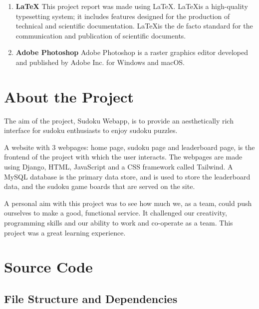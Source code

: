 \documentclass[12pt, a4paper]{report}
\begin{document}
\begin{enumerate}
        \item \textbf{\LaTeX} \newline
        This project report was made using \LaTeX. \LaTeX is a high-quality typesetting system; it includes features designed for the production of technical and scientific documentation. \LaTeX is the de facto standard for the communication and publication of scientific documents.
        \item \textbf{Adobe Photoshop} \newline
        Adobe Photoshop is a raster graphics editor developed and published by Adobe Inc. for Windows and macOS.
    \end{enumerate}
    
    
  \newpage
  \section{About the Project}
  The aim of the project, Sudoku Webapp, is to provide an aesthetically rich interface for sudoku enthusiasts to enjoy sudoku puzzles.\newline

  A website with 3 webpages: home page, sudoku page and leaderboard page, is the frontend of the project with which the user interacts. The webpages are made using Django, HTML, JavaScript and a CSS framework called Tailwind. A MySQL database is the primary data store, and is used to store the leaderboard data, and the sudoku game boards that are served on the site.\newline

  A personal aim with this project was to see how much we, as a team, could push ourselves to make a good, functional service. It challenged our creativity, programming skills and our ability to work and co-operate as a team. This project was a great learning experience.

  
  \newpage
  \section{Source Code}
    \subsection{File Structure and Dependencies}
\end{document}
